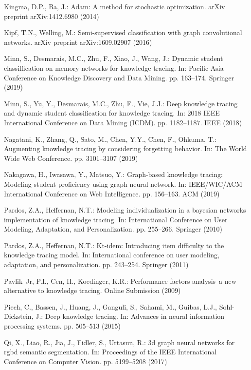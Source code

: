 \documentclass[runningheads]{llncs}
\begin{document}
\begin{thebibliography}{10}
	Kingma, D.P., Ba, J.: Adam: A method for stochastic optimization. arXiv
	preprint arXiv:1412.6980  (2014)
	
	Kipf, T.N., Welling, M.: Semi-supervised classification with graph
	convolutional networks. arXiv preprint arXiv:1609.02907  (2016)
	
	Minn, S., Desmarais, M.C., Zhu, F., Xiao, J., Wang, J.: Dynamic student
	classiffication on memory networks for knowledge tracing. In: Pacific-Asia
	Conference on Knowledge Discovery and Data Mining. pp. 163--174. Springer
	(2019)
	
	Minn, S., Yu, Y., Desmarais, M.C., Zhu, F., Vie, J.J.: Deep knowledge tracing
	and dynamic student classification for knowledge tracing. In: 2018 IEEE
	International Conference on Data Mining (ICDM). pp. 1182--1187. IEEE (2018)
	
	Nagatani, K., Zhang, Q., Sato, M., Chen, Y.Y., Chen, F., Ohkuma, T.: Augmenting
	knowledge tracing by considering forgetting behavior. In: The World Wide Web
	Conference. pp. 3101--3107 (2019)
	
	Nakagawa, H., Iwasawa, Y., Matsuo, Y.: Graph-based knowledge tracing: Modeling
	student proficiency using graph neural network. In: IEEE/WIC/ACM
	International Conference on Web Intelligence. pp. 156--163. ACM (2019)
	
	Pardos, Z.A., Heffernan, N.T.: Modeling individualization in a bayesian
	networks implementation of knowledge tracing. In: International Conference on
	User Modeling, Adaptation, and Personalization. pp. 255--266. Springer (2010)
	
	Pardos, Z.A., Heffernan, N.T.: Kt-idem: Introducing item difficulty to the
	knowledge tracing model. In: International conference on user modeling,
	adaptation, and personalization. pp. 243--254. Springer (2011)
	
	Pavlik~Jr, P.I., Cen, H., Koedinger, K.R.: Performance factors analysis--a new
	alternative to knowledge tracing. Online Submission  (2009)
	
	Piech, C., Bassen, J., Huang, J., Ganguli, S., Sahami, M., Guibas, L.J.,
	Sohl-Dickstein, J.: Deep knowledge tracing. In: Advances in neural
	information processing systems. pp. 505--513 (2015)
	
	Qi, X., Liao, R., Jia, J., Fidler, S., Urtasun, R.: 3d graph neural networks
	for rgbd semantic segmentation. In: Proceedings of the IEEE International
	Conference on Computer Vision. pp. 5199--5208 (2017)
	

\end{thebibliography}
\end{document}
